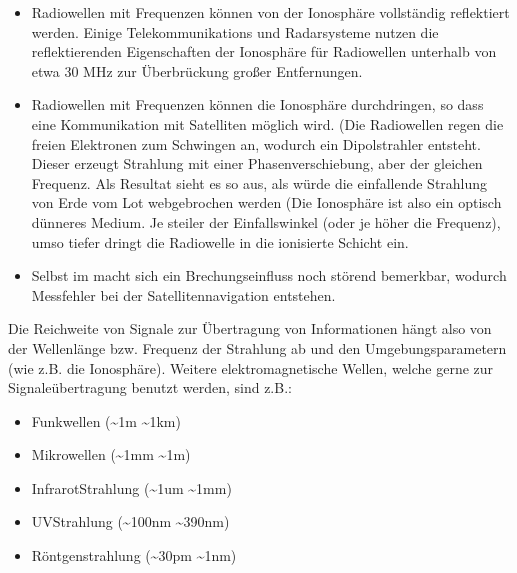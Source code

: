 \documentclass[letterpaper,10pt,english]{jupyterBook}
\begin{document}
\begin{itemize}
\item {} 
\sphinxAtStartPar
Radiowellen mit Frequenzen  können von der Ionosphäre vollständig reflektiert werden. Einige Telekommunikations\sphinxhyphen{} und Radarsysteme nutzen die reflektierenden Eigenschaften der Ionosphäre für Radiowellen unterhalb von etwa 30 MHz zur Überbrückung großer Entfernungen.

\item {} 
\sphinxAtStartPar
Radiowellen mit Frequenzen  können die Ionosphäre durchdringen, so dass eine Kommunikation mit Satelliten möglich wird.  (Die Radiowellen regen die freien Elektronen zum Schwingen an, wodurch ein Dipolstrahler entsteht. Dieser erzeugt Strahlung mit einer Phasenverschiebung, aber der gleichen Frequenz. Als Resultat sieht es so aus, als würde die einfallende Strahlung von Erde vom Lot webgebrochen werden (Die Ionosphäre ist also ein optisch dünneres Medium. Je steiler der Einfallswinkel (oder je höher die Frequenz), umso tiefer dringt die Radiowelle in die ionisierte Schicht ein.

\item {} 
\sphinxAtStartPar
Selbst im  macht sich ein Brechungseinfluss noch störend bemerkbar, wodurch Messfehler bei der Satellitennavigation entstehen.

\end{itemize}

\sphinxAtStartPar
Die Reichweite von Signale zur Übertragung von Informationen hängt also von der Wellenlänge bzw. Frequenz der Strahlung ab und den Umgebungsparametern (wie z.B. die Ionosphäre). Weitere  elektromagnetische Wellen, welche gerne zur Signaleübertragung benutzt werden, sind z.B.:
\begin{itemize}
\item {} 
\sphinxAtStartPar
Funkwellen (\textasciitilde{}1m \sphinxhyphen{} \textasciitilde{}1km)

\item {} 
\sphinxAtStartPar
Mikrowellen (\textasciitilde{}1mm \sphinxhyphen{} \textasciitilde{}1m)

\item {} 
\sphinxAtStartPar
Infrarot\sphinxhyphen{}Strahlung (\textasciitilde{}1um \sphinxhyphen{} \textasciitilde{}1mm)

\item {} 
\sphinxAtStartPar
UV\sphinxhyphen{}Strahlung (\textasciitilde{}100nm \sphinxhyphen{} \textasciitilde{}390nm)

\item {} 
\sphinxAtStartPar
Röntgenstrahlung (\textasciitilde{}30pm \sphinxhyphen{} \textasciitilde{}1nm)

\end{itemize}
\end{document}
